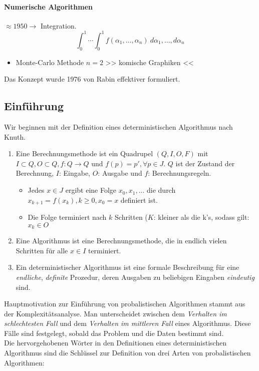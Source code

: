 \documentclass[a4paper]{scrartcl}
\begin{document}
\paragraph{Numerische Algorithmen} $\approx 1950 \rightarrow $ Integration.\\
$$ \int_0^1 \cdots \int_0^1 f(\alpha_1, \dots, \alpha_n) \ d \alpha_1, \dots, d \alpha_n $$

\begin{itemize}
\item Monte-Carlo Methode $n=2$
>> komische Graphiken <<
\end{itemize}

Das Konzept wurde 1976 von Rabin effektiver formuliert.

\subsection{Einführung}
Wir beginnen mit der Definition eines deterministischen Algorithmus nach Knuth.

\begin{enumerate}
\item Eine Berechnungsmethode ist ein Quadrupel $( Q,I,O,F )$ mit $ I \subset Q, O \subset Q, f: Q \rightarrow Q$
und $f(p) = p' , \forall p \in J$. $Q$ ist der Zustand der Berechnung, $I$: Eingabe, $O$: Ausgabe und $f$:
Berechnungsregeln.
\begin{itemize}
\item Jedes $x \in J$ ergibt eine Folge $x_0, x_1, \dots$ die durch $x_{k+1} = f(x_k), k \geq 0, x_0 = x$ definiert ist.
\item Die Folge terminiert nach $k$ Schritten ($K$: kleiner als die k's, sodass gilt: $x_k \in O$
\end{itemize}
\item Eine Algorithmus ist eine Berechnungsmethode, die in endlich vielen Schritten für alle $x \in I$ terminiert.
\item Ein deterministischer Algorithmus ist eine formale Beschreibung für eine \emph{endliche}, \emph{definite} Prozedur, deren Ausgaben zu beliebigen Eingaben \emph{eindeutig} sind.
\end{enumerate}

Hauptmotivation zur Einführung von probalistischen Algorithmen stammt aus der Komplexitätsanalyse. Man unterscheidet zwischen dem 
\emph{Verhalten im schlechtesten Fall} und dem \emph{Verhalten im mittleren Fall} eines Algorithmus. Diese Fälle sind festgelegt, sobald das Problem und die Daten bestimmt sind.\\
Die hervorgehobenen Wörter in den Definitionen eines deterministischen Algorithmus sind die Schlüssel zur Definition von drei Arten von probalistischen Algorithmen:
\end{document}

